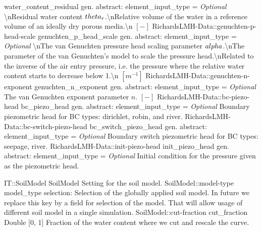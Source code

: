 \begin{RecordType}
			{water{\_}content{\_}residual}
			{{gen. abstract: }}{{element{\_}input{\_}type}{ = }}
			{ \it{Optional}}
			{{{{\textbackslash}nResidual water content }{$ \\theta_r $}{.{\textbackslash}nRelative volume of the water in a reference volume of an ideally dry porous media.{\textbackslash}n }{$[-]$}%
}}
		\RecKey
			{RichardsLMH-Data::genuchten-p-head-scale}
			{genuchten{\_}p{\_}head{\_}scale}
			{{gen. abstract: }}{{element{\_}input{\_}type}{ = }}
			{ \it{Optional}}
			{{{{\textbackslash}nThe van Genuchten pressure head scaling parameter }{$ \\alpha $}{.{\textbackslash}nThe parameter of the van Genuchten's model to scale the pressure head.{\textbackslash}nRelated to the inverse of the air entry pressure, i.e. the pressure where the relative water content starts to decrease below 1.{\textbackslash}n }{$[m^{-1}]$}%
}}
		\RecKey
			{RichardsLMH-Data::genuchten-n-exponent}
			{genuchten{\_}n{\_}exponent}
			{{gen. abstract: }}{{element{\_}input{\_}type}{ = }}
			{ \it{Optional}}
			{{{The van Genuchten exponent parameter }{$ n $}{. }{$[-]$}%
}}
		\RecKey
			{RichardsLMH-Data::bc-piezo-head}
			{bc{\_}piezo{\_}head}
			{{gen. abstract: }}{{element{\_}input{\_}type}{ = }}
			{ \it{Optional}}
			{{{Boundary piezometric head for BC types: dirichlet, robin, and river.}%
}}
		\RecKey
			{RichardsLMH-Data::bc-switch-piezo-head}
			{bc{\_}switch{\_}piezo{\_}head}
			{{gen. abstract: }}{{element{\_}input{\_}type}{ = }}
			{ \it{Optional}}
			{{{Boundary switch piezometric head for BC types: seepage, river.}%
}}
		\RecKey
			{RichardsLMH-Data::init-piezo-head}
			{init{\_}piezo{\_}head}
			{{gen. abstract: }}{{element{\_}input{\_}type}{ = }}
			{ \it{Optional}}
			{{{Initial condition for the pressure given as the piezometric head.}%
}}
\end{RecordType}
\begin{RecordType}
	{IT::SoilModel}
	{SoilModel}
	{}%
	{}%
	{{{Setting for the soil model.}%
}}
		\RecKey
			{SoilModel::model-type}
			{model{\_}type}
			{{selection: }}{}
			{ }
			{{{Selection of the globally applied soil model.
In future we replace this key by a field for selection of the model.
That will allow usage of different soil model in a single simulation.}%
}}
		\RecKey
			{SoilModel::cut-fraction}
			{cut{\_}fraction}
			{{Double [0, 1]}}{}
			{ }
			{{{Fraction of the water content where we cut  and rescale the curve.}%
}}
\end{RecordType}
